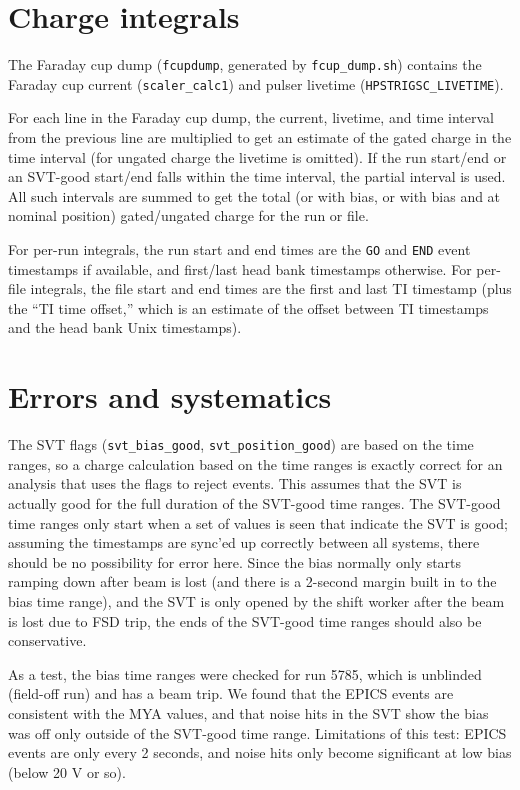 \documentclass[aps,amsmath,amssymb,notitlepage,11pt,onecolumn]{revtex4-1}
\begin{document}
\section{Charge integrals}
The Faraday cup dump (\texttt{fcupdump}, generated by \texttt{fcup\_dump.sh}) contains the Faraday cup current (\texttt{scaler\_calc1}) and pulser livetime (\texttt{HPSTRIGSC\_LIVETIME}).

For each line in the Faraday cup dump, the current, livetime, and time interval from the previous line are multiplied to get an estimate of the gated charge in the time interval (for ungated charge the livetime is omitted).
If the run start/end or an SVT-good start/end falls within the time interval, the partial interval is used.
All such intervals are summed to get the total (or with bias, or with bias and at nominal position) gated/ungated charge for the run or file.

For per-run integrals, the run start and end times are the \texttt{GO} and \texttt{END} event timestamps if available, and first/last head bank timestamps otherwise.
For per-file integrals, the file start and end times are the first and last TI timestamp (plus the ``TI time offset,'' which is an estimate of the offset between TI timestamps and the head bank Unix timestamps).

\section{Errors and systematics}
The SVT flags (\texttt{svt\_bias\_good}, \texttt{svt\_position\_good}) are based on the time ranges, so a charge calculation based on the time ranges is exactly correct for an analysis that uses the flags to reject events.
This assumes that the SVT is actually good for the full duration of the SVT-good time ranges.
The SVT-good time ranges only start when a set of values is seen that indicate the SVT is good; assuming the timestamps are sync'ed up correctly between all systems, there should be no possibility for error here.
Since the bias normally only starts ramping down after beam is lost (and there is a 2-second margin built in to the bias time range), and the SVT is only opened by the shift worker after the beam is lost due to FSD trip, the ends of the SVT-good time ranges should also be conservative.

As a test, the bias time ranges were checked for run 5785, which is unblinded (field-off run) and has a beam trip.
We found that the EPICS events are consistent with the MYA values, and that noise hits in the SVT show the bias was off only outside of the SVT-good time range.
Limitations of this test: EPICS events are only every 2 seconds, and noise hits only become significant at low bias (below 20 V or so).
\end{document}
